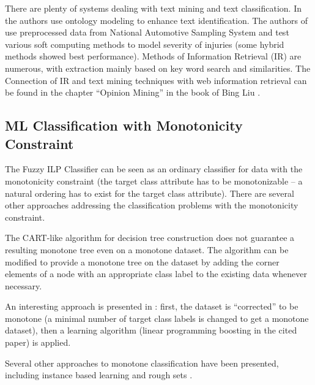 There are plenty of systems dealing with text mining and text classification. In \citep{biblio:ReYaLiOntoText08} the authors use ontology modeling to enhance text identification. The authors of \citep{biblio:CAP} use preprocessed data from National Automotive Sampling System and test various soft computing methods to model severity of injuries (some hybrid methods showed best performance). Methods of Information Retrieval (IR) are numerous, with extraction mainly based on key word search and similarities. The Connection of IR and text mining techniques with web information retrieval can be found in the chapter ``Opinion Mining'' in the book of Bing Liu \citep{biblio:WebDataMining}. 

\subsection{ML Classification with Monotonicity Constraint}
The Fuzzy ILP Classifier can be seen as an ordinary classifier for data with the monotonicity constraint (the target class attribute has to be monotonizable -- a natural ordering has to exist for the target class attribute). There are several other approaches addressing the classification problems with the monotonicity constraint.

The CART-like algorithm for decision tree construction does not guarantee a resulting monotone tree even on a monotone dataset. The algorithm can be modified \citep{biblio:mon_trees} to provide a monotone tree on the dataset by adding the corner elements of a node with an appropriate class label to the existing data whenever necessary.

An interesting approach is presented in \citep{biblio:mon_transf}: first, the dataset is ``corrected'' to be monotone (a minimal number of target class labels is changed to get a monotone dataset), then a learning algorithm (linear programming boosting in the cited paper) is applied.

Several other approaches to monotone classification have been presented, including instance based learning \citep{biblio:ibl} and rough sets \citep{biblio:rough_sets}.








